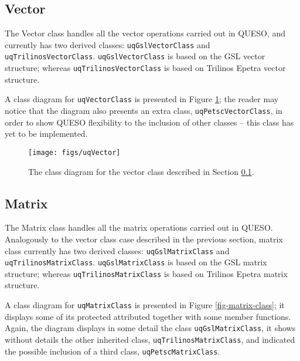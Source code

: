   

\subsection{Vector}\label{sec:vector_class}


The Vector class handles all the vector operations carried out in QUESO, and currently has two derived classes: \verb+uqGslVectorClass+ and \verb+uqTrilinosVectorClass+. \verb+uqGslVectorClass+ is based on the GSL vector structure; whereas \verb+uqTrilinosVectorClass+ is based on Trilinos Epetra vector structure.  

A class diagram for \verb+uqVectorClass+  is presented in Figure \ref{fig-vector-class}; the reader may notice that the diagram also presents an extra class, \verb+uqPetscVectorClass+, in order to show QUESO flexibility to the inclusion of other classes -- this class has yet to be implemented.


\begin{figure}[!htpb]
\centering
\texttt{[image: figs/uqVector]}
\vspace*{-8pt}
\caption{ The class diagram for the vector class described in Section \ref{sec:vector_class}.}
\label{fig-vector-class}
\end{figure}



\subsection{Matrix}\label{sec:matrix_class}



The Matrix class handles all the matrix operations carried out in QUESO.  Analogously to the vector class case described in the previous section,
matrix class currently has two derived classes: \verb+uqGslMatrixClass+ and \verb+uqTrilinosMatrixClass+. \verb+uqGslMatrixClass+ is based on the GSL matrix structure; whereas \verb+uqTrilinosMatrixClass+ is based on Trilinos Epetra matrix structure.

A class diagram for \verb+uqMatrixClass+  is presented in Figure \ref{fig-matrix-class}; it displays some of its protected attributed together with  some member functions. Again, the diagram displays in some detail the class \verb+uqGslMatrixClass+, it shows without details the other inherited class, \verb+uqTrilinosMatrixClass+, and indicated the possible inclusion of a third class, \verb+uqPetscMatrixClass+.




